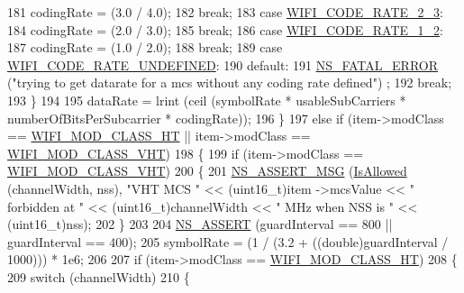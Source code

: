\begin{DoxyCode}
181           codingRate = (3.0 / 4.0);
182           \textcolor{keywordflow}{break};
183         \textcolor{keywordflow}{case} \hyperlink{namespacens3_aeaf3a86fd4bdb7829955238fba43e2ada161e88df840a9d1ed66f6f8edd0d6415}{WIFI\_CODE\_RATE\_2\_3}:
184           codingRate = (2.0 / 3.0);
185           \textcolor{keywordflow}{break};
186         \textcolor{keywordflow}{case} \hyperlink{namespacens3_aeaf3a86fd4bdb7829955238fba43e2ada66dfa017f6a74bcb72cdccfee778e90b}{WIFI\_CODE\_RATE\_1\_2}:
187           codingRate = (1.0 / 2.0);
188           \textcolor{keywordflow}{break};
189         \textcolor{keywordflow}{case} \hyperlink{namespacens3_aeaf3a86fd4bdb7829955238fba43e2adab3a130183c58362e3825366228ebf7ba}{WIFI\_CODE\_RATE\_UNDEFINED}:
190         \textcolor{keywordflow}{default}:
191           \hyperlink{group__fatal_ga5131d5e3f75d7d4cbfd706ac456fdc85}{NS\_FATAL\_ERROR} (\textcolor{stringliteral}{"trying to get datarate for a mcs without any coding rate defined"})
      ;
192           \textcolor{keywordflow}{break};
193         \}
194 
195       dataRate = lrint (ceil (symbolRate * usableSubCarriers * numberOfBitsPerSubcarrier * codingRate));
196     \}
197   \textcolor{keywordflow}{else} \textcolor{keywordflow}{if} (item->modClass == \hyperlink{namespacens3_aa999e1221606a2b21b1eb33c2007c217a6ac45cac36cc4454649435d24ebf349c}{WIFI\_MOD\_CLASS\_HT} || item->modClass == 
      \hyperlink{namespacens3_aa999e1221606a2b21b1eb33c2007c217a9863e4342bf5c238c74dddfc4d96c67e}{WIFI\_MOD\_CLASS\_VHT})
198     \{
199       \textcolor{keywordflow}{if} (item->modClass == \hyperlink{namespacens3_aa999e1221606a2b21b1eb33c2007c217a9863e4342bf5c238c74dddfc4d96c67e}{WIFI\_MOD\_CLASS\_VHT})
200         \{
201           \hyperlink{assert_8h_aff5ece9066c74e681e74999856f08539}{NS\_ASSERT\_MSG} (\hyperlink{classns3_1_1WifiMode_a996eeb87ea67b483f0c1915780012e86}{IsAllowed} (channelWidth, nss), \textcolor{stringliteral}{"VHT MCS "} << (uint16\_t)item
      ->mcsValue << \textcolor{stringliteral}{" forbidden at "} << (uint16\_t)channelWidth << \textcolor{stringliteral}{" MHz when NSS is "} << (uint16\_t)nss);
202         \}
203 
204       \hyperlink{assert_8h_a6dccdb0de9b252f60088ce281c49d052}{NS\_ASSERT} (guardInterval == 800 || guardInterval == 400);
205       symbolRate = (1 / (3.2 + ((double)guardInterval / 1000))) * 1e6;
206 
207       \textcolor{keywordflow}{if} (item->modClass == \hyperlink{namespacens3_aa999e1221606a2b21b1eb33c2007c217a6ac45cac36cc4454649435d24ebf349c}{WIFI\_MOD\_CLASS\_HT})
208         \{
209           \textcolor{keywordflow}{switch} (channelWidth)
210             \{

\end{DoxyCode}
